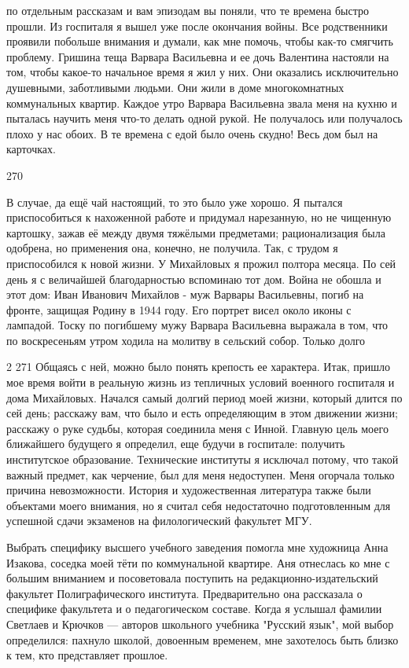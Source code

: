 по отдельным рассказам и вам эпизодам вы поняли, что те времена быстро прошли. Из госпиталя я вышел уже после окончания войны. Все родственники проявили побольше внимания и думали, как мне помочь, чтобы как-то смягчить проблему. Гришина теща Варвара Васильевна и ее дочь Валентина настояли на том, чтобы какое-то начальное время я жил у них. Они оказались исключительно душевными, заботливыми людьми. Они жили в доме многокомнатных коммунальных квартир. Каждое утро Варвара Васильевна звала меня на кухню и пыталась научить меня что-то делать одной рукой. Не получалось или получалось плохо у нас обоих. В те времена с едой было очень скудно! Весь дом был на карточках.

270

В случае, да ещё чай настоящий, то это было уже хорошо. Я пытался приспособиться к нахоженной работе и придумал нарезанную, но не чищенную картошку, зажав её между двумя тяжёлыми предметами; рационализация была одобрена, но применения она, конечно, не получила. Так, с трудом я приспособился к новой жизни. У Михайловых я прожил полтора месяца. По сей день я с величайшей благодарностью вспоминаю тот дом. Война не обошла и этот дом: Иван Иванович Михайлов - муж Варвары Васильевны, погиб на фронте, защищая Родину в 1944 году. Его портрет висел около иконы с лампадой. Тоску по погибшему мужу Варвара Васильевна выражала в том, что по воскресеньям утром ходила на молитву в сельский собор. Только долго

2
271
Общаясь с ней, можно было понять крепость ее характера.
Итак, пришло мое время войти в реальную жизнь из тепличных условий военного госпиталя и дома Михайловых.
Начался самый долгий период моей жизни, который длится по сей день; расскажу вам, что было и есть определяющим в этом движении жизни; расскажу о руке судьбы, которая соединила меня с Инной.
Главную цель моего ближайшего будущего я определил, еще будучи в госпитале: получить институтское образование. Технические институты я исключал потому, что такой важный предмет, как черчение, был для меня недоступен. Меня огорчала только причина невозможности.
История и художественная литература также были объектами моего внимания, но я считал себя недостаточно подготовленным для успешной сдачи экзаменов на филологический факультет МГУ.

Выбрать специфику высшего учебного заведения помогла мне художница Анна Изакова, соседка моей тёти по коммунальной квартире. Аня отнеслась ко мне с большим вниманием и посоветовала поступить на редакционно-издательский факультет Полиграфического института. Предварительно она рассказала о специфике факультета и о педагогическом составе. Когда я услышал фамилии Светлаев и Крючков — авторов школьного учебника "Русский язык", мой выбор определился: пахнуло школой, довоенным временем, мне захотелось быть близко к тем, кто представляет прошлое.

